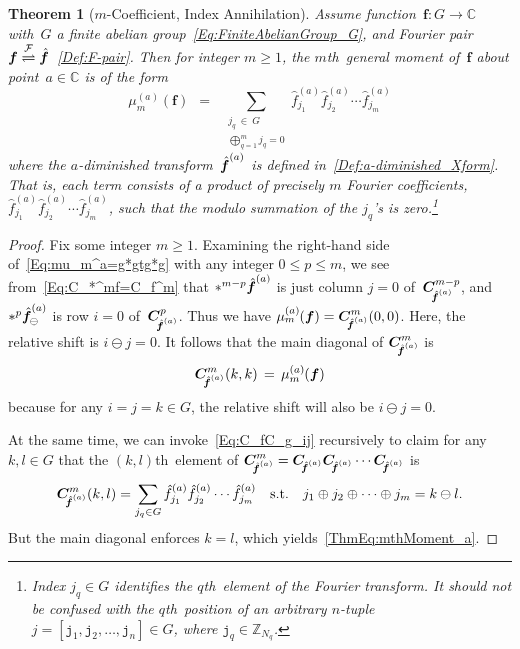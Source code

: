 \documentclass[10pt,a4paper]{amsart}
\newtheorem{thm}{Theorem}
\newcommand{\C}{\mathbb C}
\newcommand{\Int}{\mathbb Z}
\newcommand{\bcode}[1]{\texttt{#1}}
\newcommand{\bs}[1]{{\boldsymbol{#1}}}
\newcommand{\conv}{\ast}
\newcommand{\dimin}[2]{{ #1 }^{\gr{#2}}}
\newcommand{\gr}[1]{( #1 )}
\newcommand{\hatbsf}{{\kern+0.25em}\hat{{\kern-0.25em}\bs{f}}}
\newcommand{\klth}{$(k,l)$th}
\newcommand{\mth}{$m$th}
\newcommand{\qth}{$q$th}
\newcommand{\vect}[1]{[ #1 ]}
\begin{document}
\begin{thm}[$m$-Coefficient, Index Annihilation] \label{Thm:mthMoment_a}
Assume function~$\bs{f}:G\rightarrow\C$ with~$G$ a finite abelian group~\eqref{Eq:FiniteAbelianGroup_G}, and Fourier pair $\bs{f} \stackrel{\mathcal{F}}\rightleftharpoons \hatbsf$~\eqref{Def:F-pair}. Then for integer $m\geq1$, the \mth\ general moment of~$\bs{f}$ about point~$a\in\C$ is of the form
\begin{equation} \label{ThmEq:mthMoment_a}
\dimin{\mu}{a}_m\gr{\bs{f}}
\,\;=\;\; \!\!\sum_{\substack{j_q\:\!\in\:\!G\\[2pt]
\bigoplus_{q=1}^m j_q = 0}} \dimin{\hat{f}}{a}_{j_1} \dimin{\hat{f}}{a}_{j_2} \cdots \dimin{\hat{f}}{a}_{j_m}
\end{equation}
where the $a$-diminished transform~$\dimin{\hatbsf}{a}$
is defined in~\eqref{Def:a-diminished_Xform}.
That is, each term consists of a product of precisely $m$ Fourier coefficients, $\dimin{\hat{f}}{a}_{j_1} \dimin{\hat{f}}{a}_{j_2} \cdots \dimin{\hat{f}}{a}_{j_m}$, such that the modulo summation of the ${j_q}$'s is zero.\footnote{Index $j_q\in G$ identifies the \qth\ element of the Fourier transform. It should not be confused with the \qth\ position of an arbitrary $n$-tuple $j = \vect{\bcode{j}_1,\bcode{j}_2,\ldots,\bcode{j}_n} \in G$, where $\bcode{j}_q\in\Int_{N_q}$.}
\end{thm}

\begin{proof}
Fix some integer $m\geq1$. Examining the right-hand side of~\eqref{Eq:mu_m^a=g*gtg*g} with any integer $0\leq p\leq m$, we see from~\eqref{Eq:C_*^mf=C_f^m} that $\conv^{m-p} \dimin{\hatbsf}{a}$ is just column $j=0$ of~$\bs{C}_{\!\!\dimin{\hatbsf}{a}}^{m-p}$, and $\conv^p \dimin{\hatbsf}{a}_{\!\ominus}$ is row $i=0$ of~$\bs{C}_{\!\!\dimin{\hatbsf}{a}}^{p}$. Thus we have $\dimin{\mu}{a}_m\;\!\!\gr{\bs{f}} = \bs{C}_{\!\!\dimin{\hatbsf}{a}}^m \gr{0,0}$.
Here, the relative shift is $i \ominus j=0$.
It follows that the main diagonal of $\bs{C}_{\!\!\dimin{\hatbsf}{a}}^m$ is
\begin{equation} \label{Eq:C_fC_f_kk-mu_m}
\bs{C}_{\!\!\dimin{\hatbsf}{a}}^m \gr{k,k} \,=\, \dimin{\mu}{a}_m\;\!\!\gr{\bs{f}}
\end{equation}
because for any $i=j=k\in G$, the relative shift will also be $i \ominus j=0$.

At the same time, we can invoke~\eqref{Eq:C_fC_g_ij} recursively to claim for any $k,l\in G$ that the \klth\ element of $\bs{C}_{\!\!\dimin{\hatbsf}{a}}^m = \bs{C}_{\!\!\dimin{\hatbsf}{a}}\bs{C}_{\!\!\dimin{\hatbsf}{a}}\cdots\bs{C}_{\!\!\dimin{\hatbsf}{a}}$ is
$$
\bs{C}_{\!\!\dimin{\hatbsf}{a}}^m \gr{k,l} = \sum_{j_q\in G} \hat{f}_{j_1}^{\gr{a}} \hat{f}_{j_2}^{\gr{a}} \cdots \hat{f}_{j_m}^{\gr{a}} \quad \text{s.t.} \quad j_1 \oplus j_2 \oplus \cdots \oplus j_m = k \ominus l.
$$
But the main diagonal enforces $k=l$, which yields~\eqref{ThmEq:mthMoment_a}.
\end{proof}
\end{document}
